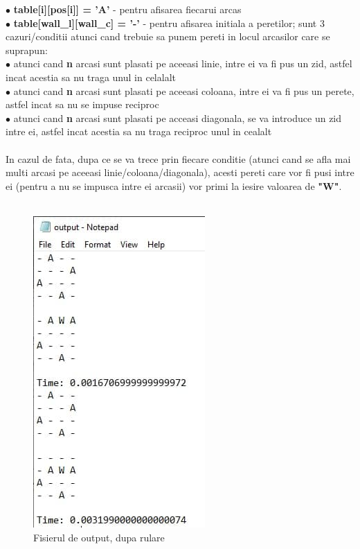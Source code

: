 \documentclass{article}
\begin{document}
$\bullet$ \textbf{table[i][pos[i]] = 'A'} - pentru afisarea fiecarui arcas \\

$\bullet$ \textbf{table[wall\_l][wall\_c] = '-'} - pentru afisarea initiala a peretilor; sunt 3 cazuri/conditii atunci cand trebuie sa punem pereti in locul arcasilor care se suprapun: \\

\hspace{1cm} $\bullet$ atunci cand \textbf{n} arcasi sunt plasati pe aceeasi linie, intre ei va fi pus un zid, astfel incat acestia sa nu traga unul in celalalt\\

\hspace{1cm} $\bullet$ atunci cand \textbf{n} arcasi sunt plasati pe aceeasi coloana, intre ei va fi pus un perete, astfel incat sa nu se impuse reciproc \\

\hspace{1cm} $\bullet$ atunci cand \textbf{n} arcasi sunt plasati pe acceasi diagonala, se va introduce un zid intre ei, astfel incat acestia sa nu traga reciproc unul in cealalt \\\\

In cazul de fata, dupa ce se va trece prin fiecare conditie (atunci cand se afla mai multi arcasi pe aceeasi linie/coloana/diagonala), acesti pereti care vor fi pusi intre ei (pentru a nu se impusca intre ei arcasii) vor primi la iesire valoarea de \textbf{"W"}. \\\\
\begin{figure}[htbp!]
\centering
\includegraphics[scale=0.5]{output.jpg}
 \caption{Fisierul de output, dupa rulare}%
\end{figure}
\end{document}
